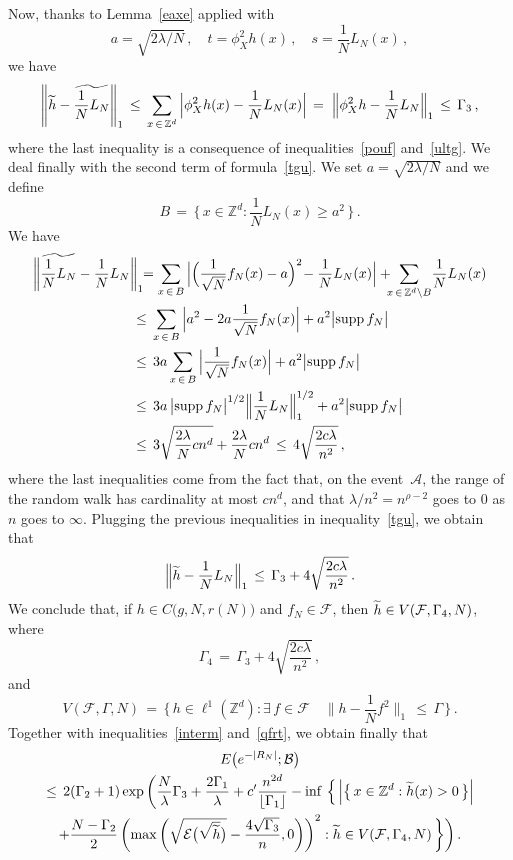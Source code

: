 \documentclass[AHL, Unicode, longabstracts, published]{cedram}
\newcommand*\supp{\text{supp\,}}
\newcommand*\Zd {{\mathbb Z^d}}
\newcommand*\wh{{\tilde h}}
\newcommand{\cA}{\mathcal{A}}
\newcommand{\cB}{\mathcal{B}}
\newcommand{\cE}{\mathcal{E}}
\newcommand{\cF}{\mathcal{F}}
\let\oldtilde\tilde
\renewcommand*{\tilde}[1]{\mathchoice{\widetilde{#1}}{\widetilde{#1}}{\oldtilde{#1}}{\oldtilde{#1}}}\let\oldhat\hat
\renewcommand*{\hat}[1]{\mathchoice{\widehat{#1}}{\widehat{#1}}{\oldhat{#1}}{\oldhat{#1}}}\let\oldexists\exists
\renewcommand*{\exists}{\mathrel{\oldexists}}
\begin{document}
Now, thanks to Lemma~\ref{eaxe} applied with
\[
a=\sqrt{{2\lambda}/{N}}\,,\quad t=\phi_X^2h(x)\,,\quad
s=\frac{1}{N}L_N(x)\,,
\]
we have
\[
\left\|\wh-\widetilde{\frac{1}{N}L_N}\right\|_{1}\,\leq\,
\sum_{x\,\in\,\Zd}\Big|\phi_X^2h(x)-\frac{1}{N}L_N(x)\Big|
\,=\;
\Big\|\phi_X^2h-{\frac{1}{N}L_N}\Big\|_{1}
\,\leq\,\Gamma_3
\,,
\]
where the last inequality is a consequence of inequalities~\eqref{pouf} and~\eqref{ultg}. We deal finally with the second term of formula~\eqref{tgu}. We set $a=\sqrt{{2\lambda}/{N}}$ and we define
\[
B\,=\,\Big\{\,x\in \Zd:
\frac{1}{N}L_N(x)\geq a^2
\,\Big\}\,.
\]
We have
\begin{align*}
\bigg\| {\widetilde {\frac{1}{N}L_N}}-
\frac{1}{N}L_N &\bigg\|_{1}
\!\!=
\sum_{x\,\in\,B}\Big|
\Big(\frac{1}{\sqrt N}f_N(x)-a\Big)^2
\!-\frac{1}{N}L_N(x)
\Big| +
\!\!\!
\sum_{x\,\in\,\Zd\setminus B}
\!
\frac{1}{N}L_N(x)
\\ &\,\leq\,
\sum_{x\,\in\,B}
\Big|a^2-2a\frac{1}{\sqrt N}f_N(x)\Big| +a^2\big|\supp f_N\big|
\\ &\,\leq\, 3a\sum_{x\,\in\,B}
\Big|\frac{1}{\sqrt N}f_N(x)\Big| +a^2\big|\supp f_N\big|
\\ &\,\leq\, 3a\,
\big|\supp f_N\big|^{1/2}
\Big\|
\frac{1}{N}L_N\Big\|_{1}^{1/2} +a^2\big|\supp f_N\big|\\ &\,\leq\, 3\sqrt{\frac{2\lambda}{N}cn^d} + {\frac{2\lambda}{N}cn^d}
\,\leq\, 4\sqrt{\frac{2c\lambda}{n^2}}
\,,
\end{align*}
where the last inequalities come from the fact that, on the event~$\cA$, the range of the random walk has cardinality at most $cn^d$, and that $\lambda/n^2=n^{\rho-2}$ goes to $0$ as $n$ goes to $\infty$. Plugging the previous inequalities in inequality~\eqref{tgu}, we obtain that
\[
\Big\|\wh-\frac{1}{N}L_N\Big\|_{1}
\,\leq\,
\Gamma_3+4\sqrt{\frac{2c\lambda}{n^2}}\,.
\]
We conclude that, if $h\in C\big(g,N,r(N)\big)$ and $f_N\in\cF$, then $\wh\in V(\cF,\Gamma_4,N)$, where
\[
\Gamma_4\,=\,\Gamma_3+4\sqrt{\frac{2c\lambda}{n^2}}\,,
\]
and
\begin{equation*}
V(\cF,\Gamma,N)\,=\,\Big\{\, h\in \ell^1\left(\Zd\right):
\exists\,f\in\cF\quad
\Big\|h-\frac{1}{N}f^2\Big\|_{1}
\,\leq\,\Gamma
\,\Big\}\,.\label{prox}
\end{equation*}
Together with inequalities~\eqref{interm} and~\eqref{qfrt}, we obtain finally that
\begin{multline*}
E\big(e^{-|R_N|};
\cB
\big)\\
\leq\, 2(\Gamma_2+1)
\exp\bigg(\frac{N}{\lambda}\Gamma_3 +\frac{2\Gamma_1}{\lambda} + c'\frac{n^{2d}}{\lfloor\Gamma_1\rfloor}
-\inf\,\Big\{\,
\Big|\big\{\,x\in\Zd:\wh(x)>0\,\big\}\Big|
\\
+\frac{N-\Gamma_2}{2}
\left(\max\left(
\sqrt{\cE\big(\sqrt{\wh}\big)}-
\frac{4\sqrt{\Gamma_3}}{n},0\right)\right)^2 : \wh\in V(\cF,\Gamma_4,N)
\,\bigg\}\bigg)
\,.
\end{multline*}
\end{document}
